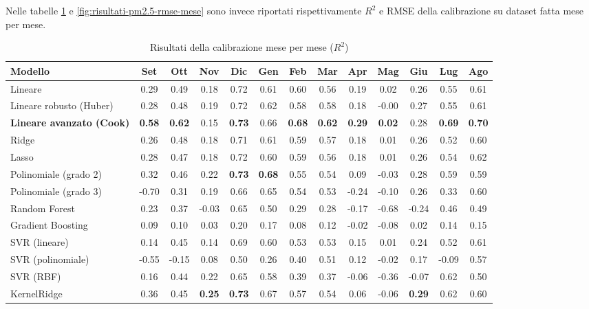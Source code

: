 Nelle tabelle \ref{fig:risultati-pm2.5-mese} e \ref{fig:risultati-pm2.5-rmse-mese} sono invece riportati rispettivamente $R^2$ e RMSE della calibrazione su dataset  fatta mese per mese.

\begin{table}[H]
    \tiny
    \centering
    \setlength{\tabcolsep}{4pt}
    \def\arraystretch{1.5}
    \begin{tabular}{|l|c|c|c|c|c|c|c|c|c|c|c|c|}
    \hline
        \textbf{Modello} & \textbf{Set} & \textbf{Ott} & \textbf{Nov} & \textbf{Dic} & \textbf{Gen} & \textbf{Feb} & \textbf{Mar} & \textbf{Apr} & \textbf{Mag} & \textbf{Giu} & \textbf{Lug} & \textbf{Ago} \\ \hline
        Lineare & 0.29 & 0.49 & 0.18 & 0.72 & 0.61 & 0.60 & 0.56 & 0.19 & 0.02 & 0.26 & 0.55 & 0.61 \\ \hline
        Lineare robusto (Huber) & 0.28 & 0.48 & 0.19 & 0.72 & 0.62 & 0.58 & 0.58 & 0.18 & -0.00 & 0.27 & 0.55 & 0.61 \\ \hline
        \textbf{Lineare avanzato (Cook)} & \textbf{0.58} & \textbf{0.62} & 0.15 & \textbf{0.73} & 0.66 & \textbf{0.68} & \textbf{0.62} & \textbf{0.29} & \textbf{0.02} & 0.28 & \textbf{0.69} & \textbf{0.70} \\ \hline
        Ridge & 0.26 & 0.48 & 0.18 & 0.71 & 0.61 & 0.59 & 0.57 & 0.18 & 0.01 & 0.26 & 0.52 & 0.60 \\ \hline
        Lasso & 0.28 & 0.47 & 0.18 & 0.72 & 0.60 & 0.59 & 0.56 & 0.18 & 0.01 & 0.26 & 0.54 & 0.62 \\ \hline
        Polinomiale (grado 2) & 0.32 & 0.46 & 0.22 & \textbf{0.73} & \textbf{0.68} & 0.55 & 0.54 & 0.09 & -0.03 & 0.28 & 0.59 & 0.59 \\ \hline
        Polinomiale (grado 3) & -0.70 & 0.31 & 0.19 & 0.66 & 0.65 & 0.54 & 0.53 & -0.24 & -0.10 & 0.26 & 0.33 & 0.60 \\ \hline
        Random Forest & 0.23 & 0.37 & -0.03 & 0.65 & 0.50 & 0.29 & 0.28 & -0.17 & -0.68 & -0.24 & 0.46 & 0.49 \\ \hline
        Gradient Boosting & 0.09 & 0.10 & 0.03 & 0.20 & 0.17 & 0.08 & 0.12 & -0.02 & -0.08 & 0.02 & 0.14 & 0.15 \\ \hline
        SVR (lineare) & 0.14 & 0.45 & 0.14 & 0.69 & 0.60 & 0.53 & 0.53 & 0.15 & 0.01 & 0.24 & 0.52 & 0.61 \\ \hline
        SVR (polinomiale) & -0.55 & -0.15 & 0.08 & 0.50 & 0.26 & 0.40 & 0.51 & 0.12 & -0.02 & 0.17 & -0.09 & 0.57 \\ \hline
        SVR (RBF) & 0.16 & 0.44 & 0.22 & 0.65 & 0.58 & 0.39 & 0.37 & -0.06 & -0.36 & -0.07 & 0.62 & 0.50 \\ \hline
        KernelRidge & 0.36 & 0.45 & \textbf{0.25} & \textbf{0.73} & 0.67 & 0.57 & 0.54 & 0.06 & -0.06 & \textbf{0.29} & 0.62 & 0.60 \\ \hline
    \end{tabular}
    \caption{Risultati della calibrazione  mese per mese ($R^2$)}
    \label{fig:risultati-pm2.5-mese}
\end{table}

